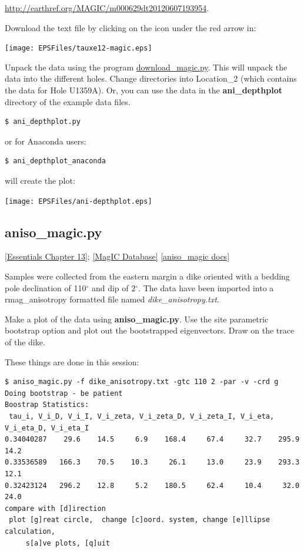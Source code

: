 \documentclass[11pt]{book}
\begin{document}
{{\url{http://earthref.org/MAGIC/m000629dt20120607193954}.

Download the text file by clicking on the icon under the red arrow in:

  \texttt{[image: EPSFiles/tauxe12-magic.eps]}

Unpack the data using the program \href{#download_magic.py}{download\_magic.py}.  This will unpack the data into the different holes.  Change directories into Location\_2 (which contains the data for Hole U1359A).  Or, you can use the data in the {\bf ani\_depthplot} directory of the example data files.


\begin{verbatim}
$ ani_depthplot.py
\end{verbatim}

or for Anaconda users:

\begin{verbatim}
$ ani_depthplot_anaconda
\end{verbatim}

\noindent will create the plot:

\texttt{[image: EPSFiles/ani-depthplot.eps]}


\subsection{aniso\_magic.py}
\href{http://earthref.org/MAGIC/books/Tauxe/Essentials/WebBook3ch13.html#ch13}{[Essentials Chapter 13]};
\href{#MagICDatabase}{[MagIC Database]}
\href{https://github.com/PmagPy/PmagPy/blob/master/programs/aniso_magic.py}{[aniso\_magic docs]}

Samples were collected from the eastern margin a dike  oriented  with a bedding pole declination of 110$^{\circ}$ and dip of 2$^{\circ}$.      The data have been imported into a rmag\_anisotropy formatted file named {\it dike\_anisotropy.txt}.

Make a plot of the data using {\bf aniso\_magic.py}.  Use the site parametric bootstrap option and plot out the bootstrapped eigenvectors.   Draw on the trace of the dike.

These things  are done in this session:

\begin{verbatim}
$ aniso_magic.py -f dike_anisotropy.txt -gtc 110 2 -par -v -crd g
Doing bootstrap - be patient
Boostrap Statistics:
 tau_i, V_i_D, V_i_I, V_i_zeta, V_i_zeta_D, V_i_zeta_I, V_i_eta, V_i_eta_D, V_i_eta_I
0.34040287    29.6    14.5     6.9    168.4     67.4     32.7    295.9     14.2
0.33536589   166.3    70.5    10.3     26.1     13.0     23.9    293.3     12.1
0.32423124   296.2    12.8     5.2    180.5     62.4     10.4     32.0     24.0
compare with [d]irection
 plot [g]reat circle,  change [c]oord. system, change [e]llipse calculation,
     s[a]ve plots, [q]uit


\end{verbatim}}}
\end{document}
